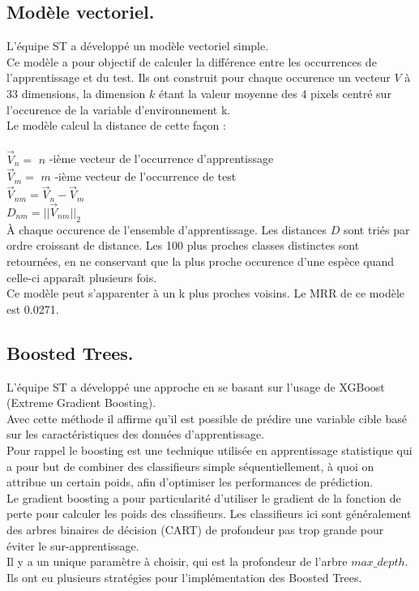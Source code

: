 \documentclass{article}
\begin{document}
\subsection{Modèle vectoriel.}
L'équipe ST a développé un modèle vectoriel simple. \\
Ce modèle a pour objectif de calculer la différence entre les occurrences de l'apprentissage et du test.
Ils ont construit pour chaque occurence un vecteur $V$ à 33 dimensions, la dimension $k$ étant la valeur moyenne des 4 pixels centré sur l’occurence de la variable d’environnement k.\\
Le modèle calcul la distance de cette façon :\\ \\
$\overrightarrow{V}_{n} = $ $n$ -ième vecteur de l'occurrence d'apprentissage \\
$\overrightarrow{V}_{m} = $ $m$ -ième vecteur de l'occurrence de test \\
$\overrightarrow{V}_{nm} = \overrightarrow{V}_{n} - \overrightarrow{V}_{m} $\\
$ D_{nm} = || \overrightarrow{V}_{nm} ||_{2}$\\
À chaque occurence de l’ensemble d’apprentissage. Les distances $D$ sont triés par ordre croissant de distance. Les 100 plus proches classes distinctes sont retournées, en ne conservant que la plus proche occurence d’une espèce quand celle-ci apparaît plusieurs fois.\\
Ce modèle peut s'apparenter à un k plus proches voisins.
Le MRR de ce modèle est 0.0271.




\subsection{Boosted Trees.}
L'équipe ST a développé une approche en se basant sur l'usage de XGBoost (Extreme Gradient Boosting). \\
Avec cette méthode il affirme qu'il est possible de prédire une variable cible basé sur les caractéristiques des données d'apprentissage.\\
Pour rappel le boosting est une technique utilisée en apprentissage statistique qui a pour but de combiner des classifieurs simple séquentiellement, à quoi on attribue un certain poids, afin d'optimiser les performances de prédiction.\\ Le gradient boosting a pour particularité d'utiliser le gradient de la fonction de perte pour calculer les poids des classifieurs. Les classifieurs ici sont généralement des arbres binaires de décision (CART) de profondeur pas trop grande pour éviter le sur-apprentissage.\\ Il y a un unique paramètre à choisir, qui est la profondeur de l'arbre $max\_depth$.\\
Ils ont eu plusieurs stratégies pour l'implémentation des Boosted Trees. 
\end{document}
